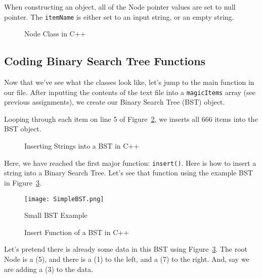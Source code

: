 \documentclass[letterpaper, 10pt,DIV=13]{scrartcl}
\numberwithin{equation}{section} %
\numberwithin{figure}{section} %
\numberwithin{table}{section} %
\begin{document}
When constructing an object, all of the Node pointer values are set to null pointer. The \texttt{itemName} is either set to an input string, or an empty string.


\begin{figure}[h] 
    \centering 
    
    \caption{Node Class in C++}
    \label{figure:NodeClass}
\end{figure}




\subsection{Coding Binary Search Tree Functions}
Now that we've see what the classes look like, let's jump to the main function in our file. After inputting the contents of the text file into a \texttt{magicItems} array (see previous assignments), we create our Binary Search Tree (BST) object.

Looping through each item on line 5 of Figure~\ref{figure:MainInsert}, we inserts all 666 items into the BST object.

\begin{figure}[h] 
    \centering 
    
    \caption{Inserting Strings into a BST in C++}
    \label{figure:MainInsert}
\end{figure}

Here, we have reached the first major function: \texttt{insert()}. Here is how to insert a string into a Binary Search Tree. Let's see that function using the example BST in Figure~\ref{figure:SimpleBST}.

\begin{figure}[h] 
    \centering 
    \texttt{[image: SimpleBST.png]}
    \caption{Small BST Example}
    \label{figure:SimpleBST}
    
\end{figure}

\pagebreak

\begin{figure}[h] 
    \centering 
    
    \caption{Insert Function of a BST in C++}
    \label{figure:Insert}
\end{figure}


Let's pretend there is already some data in this BST using Figure~\ref{figure:SimpleBST}. The root Node is a (5), and there is a (1) to the left, and a (7) to the right. And, say we are adding a (3) to the data.
\end{document}

